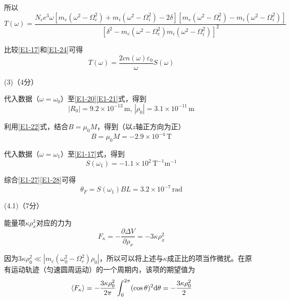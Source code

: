 \documentclass[10pt,a4paper,onecolumn,UTF8]{ctexart}
\begin{document}
	所以
	\begin{equation}\label{E1-24}
		T(\omega)=\frac{N_ce^3\omega\left[m_e(\omega^2-\Omega_e^2)+m_i(\omega^2-\Omega_i^2)-2\delta\right]\left[m_e(\omega^2-\Omega_e^2)-m_i(\omega^2-\Omega_i^2)\right]}{\left[\delta^2-m_e(\omega^2-\Omega_e^2)m_i(\omega^2-\Omega_i^2)\right]^2}
	\end{equation}
	
	比较\eqref{E1-17}和\eqref{E1-24}可得
	\begin{equation}
		T(\omega)=\frac{2cn(\omega)\varepsilon_0}{\omega}S(\omega)
	\end{equation}
	
	(3)（4分）
	
	代入数据（$\omega=\omega_0$）至\eqref{E1-20}\eqref{E1-21}式，得到
	\begin{equation}\label{E1-26}
		|R_0|=9.2\times10^{-13}\,\text{m},\,|\rho_0|=3.1\times10^{-11}\,\text{m}
	\end{equation}
	
	利用\eqref{E1-22}式，结合$B=\mu_0 M$，得到（以$z$轴正方向为正）
	\begin{equation}\label{E1-27}
		B=\mu_0 M=-2.9\times10^{-4}\,\text{T}
	\end{equation}
	
	代入数据（$\omega=\omega_1$）至\eqref{E1-17}式，得到
	\begin{equation}\label{E1-28}
		S(\omega_1)=-1.1\times10^2\,\text{T}^{-1}\text{m}^{-1}
	\end{equation}
	
	综合\eqref{E1-27}\eqref{E1-28}可得
	\begin{equation}
		\theta_F=S(\omega_1)BL=3.2\times10^{-7}\,\text{rad}
	\end{equation}
	
	(4.1)（7分）
	
	能量项$\kappa\rho_x^3$对应的力为
	\begin{equation}\label{E1-30}
		F_{\kappa}=-\frac{\partial\Delta V}{\partial\rho_x}=-3\kappa\rho_x^2
	\end{equation}
	
	因为$3\kappa\rho_0^2\ll |m_e(\omega_0^2-\Omega_e^2)\rho_0|$，所以可以将上述与$\kappa$成正比的项当作微扰。在原有运动轨迹（匀速圆周运动）的一个周期内，该项的期望值为
	\begin{equation}\label{E1-31}
		\langle F_{\kappa}\rangle=-\frac{3\kappa\rho_0^2}{2\pi}\int_{0}^{2\pi}(\cos\theta)^2\mathrm{d}\theta=-\frac{3\kappa\rho_0^2}{2}
	\end{equation}
	
\end{document}
